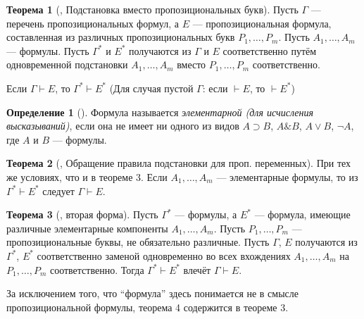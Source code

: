 \documentclass[a4paper, 12pt]{article}  %
\DeclareMathOperator{\conj}{\mathbb{\&}}
\theoremstyle{definition}
\newtheorem{theorem}{Теорема}
\newtheorem*{definition}{Определение}
\begin{document}
	\begin{theorem}[, Подстановка вместо пропозициональных букв]
		Пусть $\Gamma$ --- перечень пропозициональных формул, а $E$ --- пропозициональная формула, 
		составленная из различных пропозициональных букв $P_1, \dots, P_m$. Пусть 
		$A_1, \dots, A_m$ --- формулы. Пусть $\Gamma^*$ и $E^*$ получаются из $\Gamma$ и $E$ 
		соответственно путём одновременной подстановки $A_1, \dots, A_m$ вместо $P_1, \dots, P_m$ 
		соответственно. 
		
		Если $\Gamma \vdash E$, то $\Gamma^* \vdash E^*$ (Для случая пустой $\Gamma$: если 
		$\vdash E$, то $\vdash E^*$)
	\end{theorem}

	\begin{definition}[]
		Формула называется \textit{элементарной (для исчисления высказываний)}, если она не 
		имеет ни одного из видов $A \supset B$, $A \conj B$, $A \vee B$, $\neg A$, где $A$
		и  $B$ --- формулы.		
	\end{definition}

	\begin{theorem}[, Обращение правила подстановки для проп. переменных]
		При тех же условиях, что и в теореме 3. Если $A_1, \dots, A_m$ --- элементарные формулы, то
		из $\Gamma^* \vdash E^*$ следует $\Gamma \vdash E$.
	\end{theorem}

	\setcounter{theorem}{3}
	
	\begin{theorem}[, вторая форма]
		Пусть $\Gamma^*$ --- формулы, а $E^*$ --- формула, имеющие различные элементарные 
		компоненты $A_1, \dots, A_m$. Пусть $P_1, \dots, P_m$ --- пропозициональные буквы, не 
		обязательно различные. Пусть $\Gamma$, $E$ получаются из $\Gamma^*$, $E^*$ соответственно 
		заменой одновременно во всех вхождениях $A_1, \dots, A_m$ на $P_1, \dots, P_m$ 
		соответственно. Тогда $\Gamma^* \vdash E^*$ влечёт $\Gamma \vdash E$.
		
		За исключением того, что ``формула'' здесь понимается не в смысле пропозициональной 
		формулы, теорема 4 содержится в теореме 3.
	\end{theorem}

		
\end{document}
